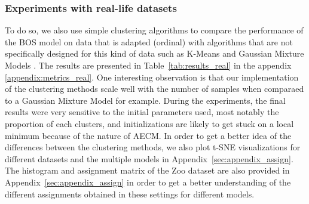 \subsubsection{Experiments with real-life datasets}
To do so, we also use simple clustering algorithms to compare the performance of the BOS model on data that is adapted (ordinal) with algorithms that are not specifically designed for this kind of data such as K-Means \citep{macqueen1967some} and Gaussian Mixture Models \citep{reynolds2009gaussian}.
The results are presented in Table~\ref{tab:results_real} in the appendix \ref{appendix:metrics_real}. One interesting observation is that our implementation of the clustering methods scale well with the number of samples when comparaed to a Gaussian Mixture Model for example. 
During the experiments, the final results were very  sensitive to the initial parameters used, most notably the proportion of each clusters, and initializations are likely to get stuck on a local minimum because of the nature of AECM.
In order to get a better idea of the differences between the clustering methods, we also plot t-SNE visualizations \citep{van2008visualizing} for different datasets and the multiple models in Appendix~\ref{sec:appendix_assign}. The histogram and assignment matrix of the Zoo dataset are also provided in Appendix~\ref{sec:appendix_assign} in order to get a better understanding of the different assignments obtained in these settings for different models.






